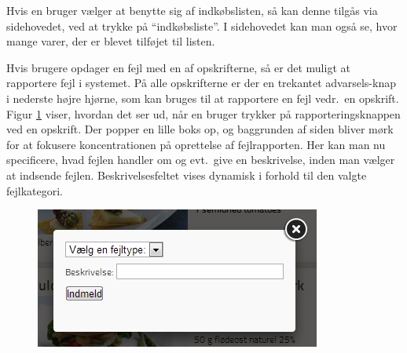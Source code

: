 Hvis en bruger vælger at benytte sig af indkøbslisten, så kan denne tilgås via sidehovedet, ved at trykke på ``indkøbsliste''. I sidehovedet kan man også se, hvor mange varer, der er blevet tilføjet til listen.

Hvis brugere opdager en fejl med en af opskrifterne, så er det muligt at rapportere fejl i systemet. På alle opskrifterne er der en trekantet advarsels-knap i nederste højre hjørne, som kan bruges til at rapportere en fejl vedr.\ en opskrift. Figur \ref{fig:foodl-fejlrapportering} viser, hvordan det ser ud, når en bruger trykker på rapporteringsknappen ved en opskrift. Der popper en lille boks op, og baggrunden af siden bliver mørk for at fokusere koncentrationen på oprettelse af fejlrapporten. Her kan man nu specificere, hvad fejlen handler om og evt.\ give en beskrivelse, inden man vælger at indsende fejlen. Beskrivelsesfeltet vises dynamisk i forhold til den valgte fejlkategori.

\begin{figure}[H]
	\centering
	\includegraphics[scale=0.7]{billeder/foodl/fejlrapportering.jpg}
	\label{fig:foodl-fejlrapportering}
\end{figure}
